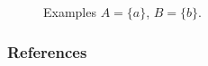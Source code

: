 \begin{frame}
\begin{figure}[ht]
\begin{center}
\begin{tabular}{cc}
        
              
          \end{tabular}
        \end{center}
        \caption{Examples $A = \{a\}$, $B = \{ b\}$.}
      \end{figure}

\end{frame}


\begin{frame}[allowframebreaks]
    \frametitle{References}
    
    
\end{frame}

